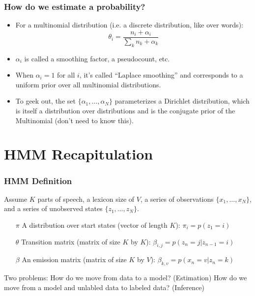 \documentclass{beamer}
\begin{document}
\begin{frame}
\frametitle{How do we estimate a probability?}

\begin{itemize}
   \item For a multinomial distribution (i.e. a discrete distribution, like over words):
     \begin{equation}
       \theta_{i} = \frac{n_i + \alpha_i}{\sum_k {n_k + \alpha_k}}
     \end{equation}
   \item $\alpha_i$ is called a smoothing factor, a pseudocount, etc.
     \pause
   \item When $\alpha_i = 1$ for all $i$, it's called ``Laplace smoothing'' and corresponds to a uniform prior over all multinomial distributions.
     \pause
   \item To geek out, the set $\{\alpha_1, \dots, \alpha_N\}$ parameterizes a Dirichlet distribution, which is itself a distribution over distributions and is the conjugate prior of the Multinomial (don't need to know this).
\end{itemize}
\end{frame}


\section{HMM Recapitulation}


\begin{frame}
\frametitle{HMM Definition}

Assume $K$ parts of speech, a lexicon size of $V$, a series of observations $\{x_1, \dots, x_N\}$, and a series of unobserved states $\{z_1, \dots, z_N\}$.

\begin{itemize}
  \item[$\pi$] A distribution over start states (vector of length $K$): $\pi_i = p(z_1 = i)$
  \item[$\theta$] Transition matrix (matrix of size $K$ by $K$): $\beta_{i,j} = p(z_{n} = j | z_{n-1} = i)$
  \item[$\beta$] An emission matrix (matrix of size $K$ by $V$): $\beta_{k,v} = p(x_n = v | z_n=k)$
\end{itemize}
\pause 

Two problems: How do we move from data to a model?  (Estimation) How do we move from a model and unlabled data to labeled data? (Inference)

\end{frame}
\end{document}
